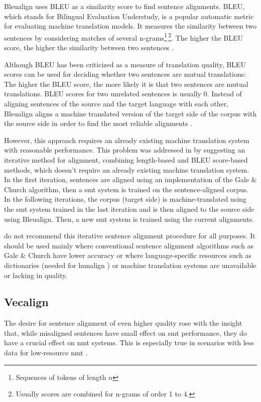 Bleualign uses BLEU as a similarity score to find sentence alignments. 
BLEU, which stands for Bilingual Evaluation Understudy, is a popular automatic metric for evaluating machine translation models. It measures the similarity between two sentences by considering matches of several n-grams\footnote{Sequences of tokens of length \(n\)}\,\footnote{Usually scores are combined for n-grams of order 1 to 4.}. 
The higher the BLEU score, the higher the similarity between two sentences \autocite[226]{koehn2009}.

Although BLEU has been criticized as a measure of translation quality, BLEU scores can be used for deciding whether two sentences are mutual translations:  
The higher the BLEU score, the more likely it is that two sentences are mutual translations. 
BLEU scores for two unrelated sentences is usually 0. Instead of aligning sentences of the source and the target language with each other, Bleualign aligns a machine translated version of the target side of the corpus with the source side in order to find the most reliable alignments \autocite{sennrich-volk-2010-mt}. 

However, this approach requires an already existing machine translation system with reasonable performance. 
This problem was addressed in \cite{sennrich-volk-2011-iterative} by suggesting an iterative method for alignment, combining length-based and BLEU score-based methods, which doesn't require an already existing machine translation system. 
In the first iteration, sentences are aligned using an implementation of the Gale \& Church algorithm, then a \acrfull{smt} system is trained on the sentence-aligned corpus. 
In the following iterations, the corpus (target side) is machine-translated using the \acrshort{smt} system trained in the last iteration and is then aligned to the source side using Bleualign. 
Then, a new \acrshort{smt} system is trained using the current alignments.

\cite{sennrich-volk-2011-iterative} do not recommend this iterative sentence alignment procedure for all purposes. 
It should be used mainly where conventional sentence alignment algorithms such as Gale \& Church have lower accuracy or where language-specific resources such as dictionaries (needed for hunalign \autocite{hunalign}) or machine translation systems are unavailable or lacking in quality.

\subsection{Vecalign}
The desire for  sentence alignment of even higher quality rose with the insight that, while misaligned sentences have small effect on \acrshort{smt} performance, they do have a crucial effect on \acrfull{nmt} systems. 
This is especially true in scenarios with less data for low-resource \acrshort{nmt} \autocite{thompson-koehn-2019-vecalign}. 

